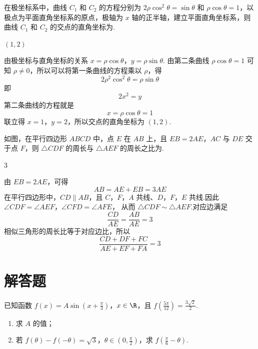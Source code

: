 \begin{problem}
在极坐标系中，曲线 \(C_{1}\) 和 \(C_{2}\) 的方程分别为 \(2\rho \cos^{2}\theta = \sin\theta\) 和 \(\rho \cos\theta = 1\)，以极点为平面直角坐标系的原点，极轴为 \(x\) 轴的正半轴，建立平面直角坐标系，则曲线 \(C_{1}\) 和 \(C_{2}\) 的交点的直角坐标为\fillinblank{}.
\end{problem}

\begin{answer}
\((1, 2)\)
\end{answer}

\begin{solution}
由极坐标与直角坐标的关系
\(x=\rho\cos\theta\)，\(y=\rho\sin\theta\).
由第二条曲线 \(\rho\cos\theta=1\) 可知 \(\rho\ne0\)，所以可以将第一条曲线的方程乘以 \(\rho\)，得
\[
2\rho^2\cos^2\theta=\rho\sin\theta
\]
即
\[
2x^2=y
\]
第二条曲线的方程就是
\[
x=\rho\cos\theta=1
\]
联立得 \(x=1\)，\(y=2\)，所以交点的直角坐标为 \((1,2)\).
\end{solution}

\begin{problem}
如图，在平行四边形 \(ABCD\) 中，点 \(E\) 在 \(AB\) 上，且 \(EB = 2AE\)，\(AC\) 与 \(DE\) 交于点 \(F\)，则 \(\triangle CDF\) 的周长与 \(\triangle AEF\) 的周长之比为\fillinblank{}.

\end{problem}

\begin{answer}
3
\end{answer}

\begin{solution}
由 \(EB=2AE\)，可得
\[
AB=AE+EB=3AE
\]
在平行四边形中，\(CD\parallel AB\)，且 \(C\)，\(F\)，\(A\) 共线、\(D\)，\(F\)，\(E\) 共线.因此
\(\angle CDF=\angle AEF\)，\(\angle CFD=\angle AFE\)，
从而 \(\triangle CDF\sim\triangle AEF\).对应边满足
\[
\frac{CD}{AE}=\frac{AB}{AE}=3
\]
相似三角形的周长比等于对应边比，所以
\[
\frac{CD+DF+FC}{AE+EF+FA}=3
\]
\end{solution}

\section{解答题}

\begin{problem}
已知函数 \(f(x) = A \sin \left( x + \frac{\pi}{3} \right)\)，\(x \in \R\)，且 \(f\left( \frac{5\pi}{12} \right) = \frac{3\sqrt{2}}{2}\).

\begin{enumerate}
\item 求 \(A\) 的值；
\item 若 \(f(\theta) - f(-\theta) = \sqrt{3}\)，\(\theta \in \left(0, \frac{\pi}{2}\right)\)，求 \(f\left(\frac{\pi}{6} - \theta\right)\).
\end{enumerate}
\end{problem}

